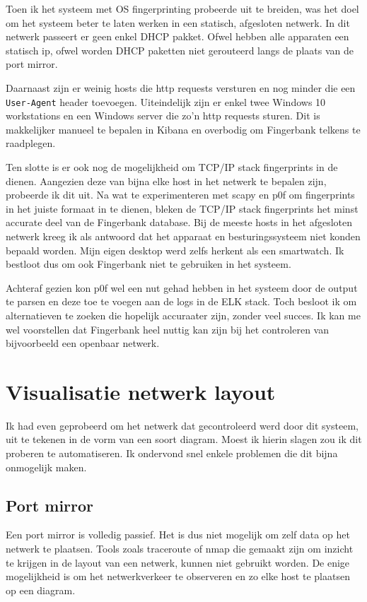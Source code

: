 \documentclass[a4paper,12pt]{report}
\begin{document}
Toen ik het systeem met OS fingerprinting probeerde uit te breiden, was het doel om het systeem beter te laten werken in een statisch, afgesloten netwerk.
In dit netwerk passeert er geen enkel DHCP pakket.
Ofwel hebben alle apparaten een statisch ip, ofwel worden DHCP paketten niet gerouteerd langs de plaats van de port mirror.

Daarnaast zijn er weinig hosts die http requests versturen en nog minder die een \lstinline|User-Agent| header toevoegen.
Uiteindelijk zijn er enkel twee Windows 10 workstations en een Windows server die zo'n http requests sturen.
Dit is makkelijker manueel te bepalen in Kibana en overbodig om Fingerbank telkens te raadplegen.

Ten slotte is er ook nog de mogelijkheid om TCP/IP stack fingerprints in de dienen.
Aangezien deze van bijna elke host in het netwerk te bepalen zijn, probeerde ik dit uit.
Na wat te experimenteren met scapy en p0f om fingerprints in het juiste formaat in te dienen, bleken de TCP/IP stack fingerprints het minst accurate deel van de Fingerbank database.
Bij de meeste hosts in het afgesloten netwerk kreeg ik als antwoord dat het apparaat en besturingssysteem niet konden bepaald worden.
Mijn eigen desktop werd zelfs herkent als een smartwatch.
Ik bestloot dus om ook Fingerbank niet te gebruiken in het systeem.

Achteraf gezien kon p0f wel een nut gehad hebben in het systeem door de output te parsen en deze toe te voegen aan de logs in de ELK stack.
Toch besloot ik om alternatieven te zoeken die hopelijk accuraater zijn, zonder veel succes.
Ik kan me wel voorstellen dat Fingerbank heel nuttig kan zijn bij het controleren van bijvoorbeeld een openbaar netwerk.

\section{Visualisatie netwerk layout}
Ik had even geprobeerd om het netwerk dat gecontroleerd werd door dit systeem, uit te tekenen in de vorm van een soort diagram.
Moest ik hierin slagen zou ik dit proberen te automatiseren.
Ik ondervond snel enkele problemen die dit bijna onmogelijk maken.

\subsection{Port mirror}
Een port mirror is volledig passief.
Het is dus niet mogelijk om zelf data op het netwerk te plaatsen.
Tools zoals traceroute of nmap die gemaakt zijn om inzicht te krijgen in de layout van een netwerk, kunnen niet gebruikt worden.
De enige mogelijkheid is om het netwerkverkeer te observeren en zo elke host te plaatsen op een diagram.
\end{document}
